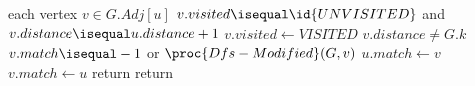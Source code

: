 \begin{codebox}
\li \For each vertex $v \in G.Adj[u]$ \Do
\li \If $v.visited \isequal \id{UNVISITED}$ and $v.distance \isequal u.distance + 1$ \Then
\li $v.visited \gets VISITED$
\li \If $v.distance \neq G.k$ \Then
\li \If $v.match \isequal -1$ or $\proc{Dfs-Modified}(G,v)$ \Then
\li $u.match \gets v$
\li $v.match \gets u$
\li return \End \End \End \End
\li return 
\end{codebox}